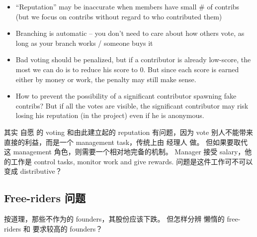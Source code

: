 \documentclass[12pt, orivec]{article}
\newcommand{\cc}[2]{#1}
\newcommand{\cc}[2]{#2}
\begin{document}
\begin{itemize}
	\item ``Reputation'' may be inaccurate when members have small \# of contribs (but we focus on contribs without regard to who contributed them)
	
	\item Branching is automatic -- you don't need to care about how others vote, as long as your branch works / someone buys it
	
	\item Bad voting should be penalized, but if a contributor is already low-score, the most we can do is to reduce his score to 0.  But since each score is earned either by money or work, the penalty may still make sense.
	
	\item How to prevent the possibility of a significant contributor spawning fake contribs?  But if all the votes are visible, the significant contributor may risk losing his reputation (in the project) even if he is anonymous.
\end{itemize}

\cc{
其实 自愿 的 voting 和由此建立起的 reputation 有问题，因为 vote 别人不能带来直接的利益，而是一个 management task，传统上由 经理人 做。  但如果要取代这 management 角色，则需要一个相对地完备的机制。   Manager 接受 salary，他的工作是 control tasks, monitor work and give rewards.   问题是这件工作可不可以变成 distributive？  }{
There may be a problem with basing reputation upon voluntary votes.  Voting for someone does not benefit the voter;  This is a management task traditionally done by managers.  If we want to replace such a role, we need an adequate mechanism.  The traditional manager gets paid, and his responsibility is to control tasks, monitor work, and give rewards.  The question is whether this job can be decentralized?
}


\secttoc
\subsection{\cc{Free-riders 问题}{The problem of free-riders}}

\cc{
按道理，那些不作为的 founders，其股份应该下跌。  但怎样分辨 懒惰的 free-riders 和 要求较高的 founders？
}{
In principle, if a founder hoards shares without performing useful work, his shares in the company should be reduced.	 But how could we distinguish between lazy free-riders and someone who has high standards for other people's work?
}
\end{document}
